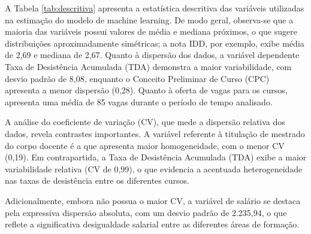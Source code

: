 A Tabela \ref{tab:descritiva} apresenta a estatística descritiva das variáveis utilizadas na estimação do modelo de machine learning. De modo geral, observa-se que a maioria das variáveis possui valores de média e mediana próximos, o que sugere distribuições aproximadamente simétricas; a nota IDD, por exemplo, exibe média de 2,69 e mediana de 2,67. Quanto à dispersão dos dados, a variável dependente Taxa de Desistência Acumulada (TDA) demonstra a maior variabilidade, com desvio padrão de 8,08, enquanto o Conceito Preliminar de Curso (CPC) apresenta a menor dispersão (0,28). Quanto à oferta de vagas para os cursos, apresenta uma média de 85 vagas durante o período de tempo analisado.

A análise do coeficiente de variação (CV), que mede a dispersão relativa dos dados, revela contrastes importantes. A variável referente à titulação de mestrado do corpo docente é a que apresenta maior homogeneidade, com o menor CV (0,19). Em contrapartida, a Taxa de Desistência Acumulada (TDA) exibe a maior variabilidade relativa (CV de 0,99), o que evidencia a acentuada heterogeneidade nas taxas de desistência entre os diferentes cursos.

Adicionalmente, embora não possua o maior CV, a variável de salário se destaca pela expressiva dispersão absoluta, com um desvio padrão de 2.235,94, o que reflete a significativa desigualdade salarial entre as diferentes áreas de formação.

